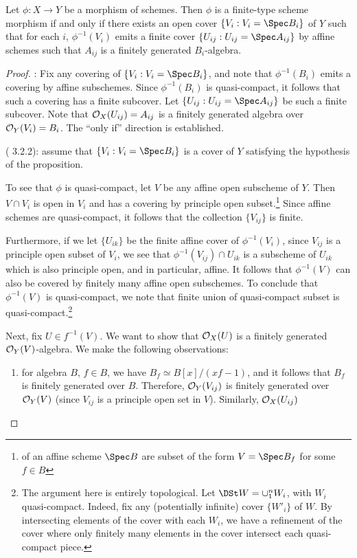 \begin{prop}
Let $\phi: X \to Y$ be a morphism of schemes. Then $\phi$ is a 
finite-type scheme morphism if and only if there exists an open 
cover $\{V_i : V_i = \Spec B_i \}$ of $Y$ such that for each $i$, 
$\phi^{-1}(V_i)$ emits a finite cover $\{U_{ij} : U_{ij} = \Spec 
A_{ij}\}$ by affine schemes such that $A_{ij}$ is a finitely 
generated $B_i$-algebra.
\end{prop}
\begin{proof}
\pfitem{$\Rightarrow$}: Fix any covering of $\{V_i : V_i = \Spec 
B_i\}$, and note that $\phi^{-1}(B_i)$ emits a covering by affine
subschemes. Since $\phi^{-1}(B_i)$ is quasi-compact, it follows that
such a covering has a finite subcover. Let $\{U_{ij} : U_{ij} = 
\Spec A_{ij}\}$ be such a finite subcover. Note that $\mathcal{O}_X(U_{ij}) 
= A_{ij}$ is a finitely generated algebra over $\mathcal{O}_Y(V_i) = B_i$.
The ``only if'' direction is established.

\pfitem{$\Leftarrow$} (\cite{Liu} 3.2.2): assume that $\{V_i :
V_i = \Spec B_i\}$ is a cover of $Y$ satisfying the hypothesis
of the proposition.

To see that $\phi$ is quasi-compact, let $V$ be any affine open 
subscheme of $Y$. Then $V \cap V_i$ is open in $V_i$ and has a
covering by principle open subset.\footnote{ of an affine scheme $\Spec B$ are 
subset of the form $V = \Spec B_f$ for some $f \in B$} Since 
affine schemes are quasi-compact, it follows that the collection 
$\{V_{ij}\}$ is finite.

Furthermore, if we let $\{U_{ik}\}$ be the finite affine cover of 
$\phi^{-1}(V_i)$, since $V_{ij}$ is a principle open subset of 
$V_i$, we see that $\phi^{-1}(V_{ij}) \cap U_{ik}$ is a subscheme 
of $U_{ik}$ which is also principle open, and in particular, 
affine.  It follows that $\phi^{-1}(V)$ can also be covered by 
finitely many affine open subschemes. To conclude that 
$\phi^{-1}(V)$ is quasi-compact, we note that finite union of 
quasi-compact subset is quasi-compact.\footnote{The argument here 
is entirely topological. Let $\DSt W = \cup_1^n W_i$, with $W_i$ 
quasi-compact. Indeed, fix any (potentially infinite) cover 
$\{W'_i\}$ of $W$. By intersecting elements of the cover with each 
$W_i$, we have a refinement of the cover where only finitely many 
elements in the cover intersect each quasi-compact piece.}

Next, fix $U \in f^{-1}(V)$. We want to show that $\mathcal{O}_X(U)$ is a
finitely generated $\mathcal{O}_Y(V)$-algebra. We make the following 
observations:
\begin{enumerate}
\item for algebra $B$, $f \in B$, we have $B_f \simeq B[x]/(xf - 
1)$, and it follows that $B_f$ is finitely generated over $B$. 
Therefore, $\mathcal{O}_Y(V_{ij})$ is finitely generated over $\mathcal{O}_Y(V)$
(since $V_{ij}$ is a principle open set in $V$). Similarly,
$\mathcal{O}_X(U_{ij})$


\end{enumerate}
\end{proof}
